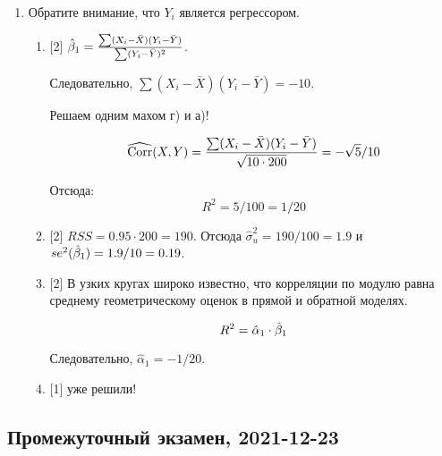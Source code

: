 \begin{enumerate}
\item Обратите внимание, что $Y_i$ является регрессором. 
\begin{enumerate}
    \item {[2]} $\hat{\beta}_1 = \frac{\sum (X_i - \bar X)(Y_i - \bar Y)}{\sum (Y_i - \bar Y)^2}$.

    Следовательно, $\sum (X_i - \bar X)(Y_i - \bar Y) = -10$. 

    Решаем одним махом г) и а)!

    \[
    \operatorname{\widehat{\operatorname{Corr}}}(X, Y) = \frac{\sum (X_i - \bar X)(Y_i - \bar Y)}{\sqrt{10\cdot 200}} = -\sqrt{5}/10    
    \]

    Отсюда:
    \[
    R^2 = 5/100 = 1/20   
    \]

    \item {[2]} $RSS = 0.95 \cdot 200 = 190$. Отсюда $\hat\sigma^2_u = 190/100 = 1.9$ и $se^2(\hat{\beta}_1) = 1.9/10=0.19$.
    \item {[2]} В узких кругах широко известно, что корреляции по модулю равна среднему геометрическому оценок 
    в прямой и обратной моделях. 

    \[
    R^2 = \hat\alpha_1 \cdot \hat{\beta}_1    
    \]

    Следовательно, $\hat\alpha_1 = -1/20$.

    \item {[1]} уже решили!
\end{enumerate}


\end{enumerate}
    



\subsection{Промежуточный экзамен, 2021-12-23}

